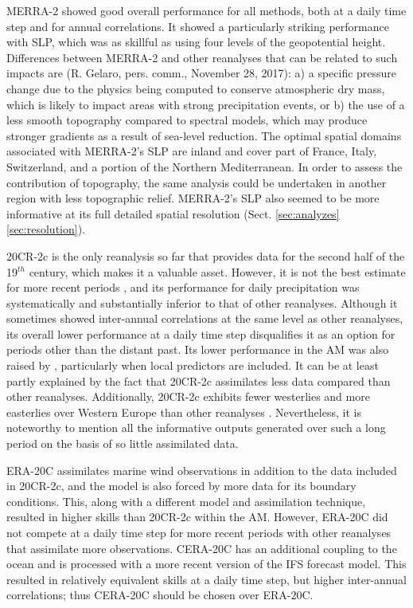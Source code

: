 \documentclass{ametsoc}
\begin{document}
	MERRA-2 showed good overall performance for all methods, both at a daily time step and for annual correlations. It showed a particularly striking performance with SLP, which was as skillful as using four levels of the geopotential height. Differences between MERRA-2 and other reanalyses that can be related to such impacts are (R. Gelaro, pers. comm., November 28, 2017): a) a specific pressure change due to the physics being computed to conserve atmospheric dry mass, which is likely to impact areas with strong precipitation events, or b) the use of a less smooth topography compared to spectral models, which may produce stronger gradients as a result of sea-level reduction. The optimal spatial domains associated with MERRA-2's SLP are inland and cover part of France, Italy, Switzerland, and a portion of the Northern Mediterranean. In order to assess the contribution of topography, the same analysis could be undertaken in another region with less topographic relief. MERRA-2's SLP also seemed to be more informative at its full detailed spatial resolution (Sect. \ref{sec:analyzes}\ref{sec:resolution}).
	
	20CR-2c is the only reanalysis so far that provides data for the second half of the 19$^{th}$ century, which makes it a valuable asset. However, it is not the best estimate for more recent periods \citep{Poli2017}, and its performance for daily precipitation was systematically and substantially inferior to that of other reanalyses. Although it sometimes showed inter-annual correlations at the same level as other reanalyses, its overall lower performance at a daily time step disqualifies it as an option for periods other than the distant past. Its lower performance in the AM was also raised by \citet[][]{Dayon2015}, particularly when local predictors are included. It can be at least partly explained by the fact that 20CR-2c assimilates less data compared than other reanalyses. Additionally, 20CR-2c exhibits fewer westerlies and more easterlies over Western Europe than other reanalyses \citep{Rohrer2018} . Nevertheless, it is noteworthy to mention all the informative outputs generated over such a long period on the basis of so little assimilated data.
	
	ERA-20C assimilates marine wind observations in addition to the data included in 20CR-2c, and the model is also forced by more data for its boundary conditions. This, along with a different model and assimilation technique, resulted in higher skills than 20CR-2c within the AM. However, ERA-20C did not compete at a daily time step for more recent periods with other reanalyses that assimilate more observations. CERA-20C has an additional coupling to the ocean and is processed with a more recent version of the IFS forecast model. This resulted in relatively equivalent skills at a daily time step, but higher inter-annual correlations; thus CERA-20C should be chosen over ERA-20C.
	
\end{document}
